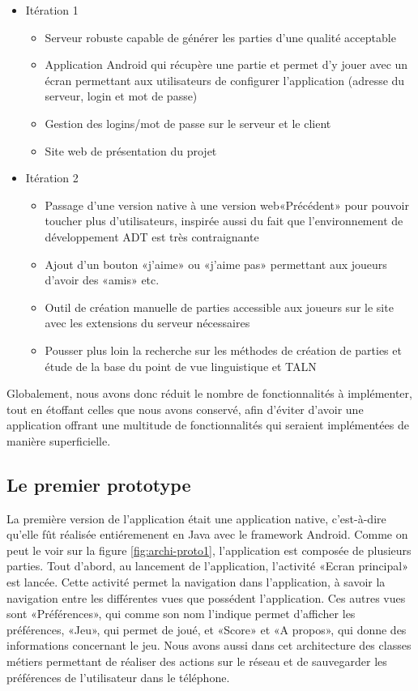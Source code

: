 \documentclass[a4paper,11pt,french]{article}
\def\android{Android\texttrademark{}}
\begin{document}
\begin{itemize}
\item Itération 1 
  \begin{itemize}
  \item Serveur robuste capable de générer les parties d'une qualité acceptable
  \item Application \android{} qui récupère une partie et permet d'y jouer avec un écran permettant aux utilisateurs de configurer
    l'application (adresse du serveur, login et mot de passe)
  \item Gestion des logins/mot de passe sur le serveur et le client
  \item Site web de présentation du projet
  \end{itemize}
\item Itération 2
  \begin{itemize}
  \item Passage d'une version native à une version web«Précédent» pour pouvoir toucher plus d'utilisateurs, inspirée aussi du fait que l'environnement de développement ADT est très contraignante
  \item Ajout d'un bouton «j'aime» ou «j'aime pas» permettant aux joueurs d'avoir des «amis» etc.
  \item Outil de création manuelle de parties accessible aux joueurs sur le site avec les extensions du serveur nécessaires
  \item Pousser plus loin la recherche sur les méthodes de création de parties et étude de la base du point de vue linguistique et TALN
  \end{itemize}
\end{itemize}

Globalement, nous avons donc réduit le nombre de fonctionnalités à implémenter, tout en étoffant celles que nous avons conservé, afin
d'éviter d'avoir une application offrant une multitude de fonctionnalités qui seraient implémentées de manière superficielle.



\subsection{Le premier prototype}

La première version de l'application était une application native, c'est-à-dire qu'elle fût réalisée entiéremenent en Java avec le framework \android{}. Comme on peut le voir sur la figure \ref{fig:archi-proto1}, l'application est composée de plusieurs parties. Tout d'abord, au lancement de l'application, l'activité «Ecran principal» est lancée. Cette activité permet la navigation dans l'application, à savoir la navigation entre les différentes vues que possédent l'application. Ces autres vues sont «Préférences», qui comme son nom l'indique permet d'afficher les préférences, «Jeu», qui permet de joué, et «Score» et «A propos», qui donne des informations concernant le jeu.
Nous avons aussi dans cet architecture des classes métiers permettant de réaliser des actions sur le réseau et de sauvegarder les préférences de l'utilisateur dans le téléphone.
\end{document}
